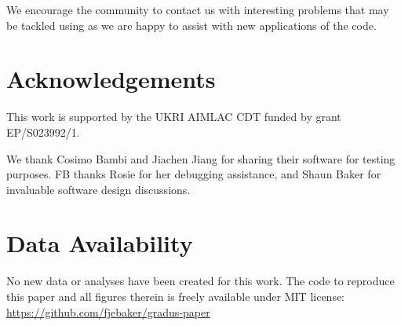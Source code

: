 \documentclass[fleqn,usenatbib]{mnras}
\begin{document}
We encourage the community to contact us with interesting problems that may be tackled using \Gradus as we are happy to assist with new applications of the code.



\section*{Acknowledgements}
This work is supported by the UKRI AIMLAC CDT funded by grant EP/S023992/1.

We thank Cosimo Bambi and Jiachen Jiang for sharing their software for testing purposes. FB thanks Rosie for her debugging assistance, and Shaun Baker for invaluable software design discussions.


\section*{Data Availability}

No new data or analyses have been created for this work. The code to reproduce this paper and all figures therein is freely available under MIT license:
\url{https://github.com/fjebaker/gradus-paper}










\appendix








\bsp	%
\label{lastpage}
\end{document}
